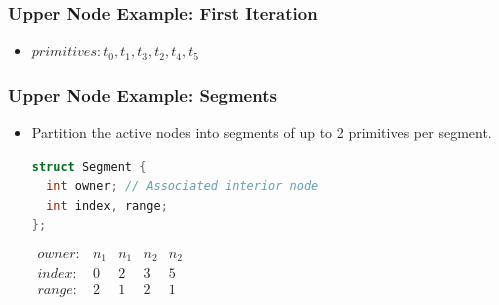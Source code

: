 \documentclass{beamer}
\newcommand{\drawTri}[3]{
  \draw[fill=lightgray, drop shadow, rounded corners=0mm] (#1) -- (#2) -- (#3) -- (#1);
}
\newcommand{\drawSplit}[2]{
  \draw[dashed,line width=0.75pt] (#1) -- (#2);
}
\newcommand{\axes}[2]{
  \draw[->] (0,0) -- coordinate (x axis mid) (#1,0);
  \draw[->] (0,0) -- coordinate (y axis mid) (0,#2);
  \foreach \x in {0,2,...,#1}
            \draw (\x,1pt) -- (\x,-3pt)
		    node[anchor=north] {\x};
  \foreach \y in {0,2,...,#2}
     	    \draw (1pt,\y) -- (-3pt,\y) 
     		    node[anchor=east] {\y}; 

}
\newcommand{\scene}{
  \axes{11}{9}

  \drawTri{0,6}{2,8}{2,4}
  \draw (1.33,6.5) node {0};
  \drawTri{2,6}{4,8}{2,8}
  \draw (2.66,7.33) node {1};
  \drawTri{2,6}{4,4}{2,4}
  \draw (2.67,4.67) node {3};

  \drawTri{7,8}{7,4}{9,4}
  \draw (7.67,5.33) node {2};
  \drawTri{9,0}{10,2}{6,3}
  \draw (8.33,1.66) node {4};
  \drawTri{6,3}{6,1}{8,1}
  \draw (6.67,1.67) node {5};
}
\begin{document}
\begin{frame}
  \frametitle{Upper Node Example: First Iteration}
  \begin{minipage}{0.4\textwidth}
  \end{minipage}
  \begin{minipage}{0.5\textwidth}
    \centering
  \end{minipage}
  \vspace{10pt}
  \begin{itemize}
    \item[] $primitives: t_0, t_1, t_3, t_2, t_4, t_5$
  \end{itemize}
\end{frame}

\begin{frame}[fragile]
  \frametitle{Upper Node Example: Segments}
  \begin{itemize}
  \item Partition the active nodes into segments of up to 2 primitives per
    segment.\\
  \begin{lstlisting}[language=C++]
struct Segment {
  int owner; // Associated interior node
  int index, range;
};
    \end{lstlisting}

    $\begin{array}{lcccc}
      owner: & n_1 & n_1 & n_2 & n_2 \\
      index: & 0 & 2 & 3 & 5 \\
      range: & 2 & 1 & 2 & 1 \\
    \end{array}$
  \end{itemize}
\end{frame}
\end{document}

